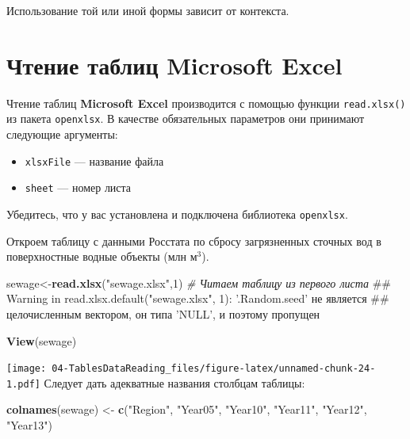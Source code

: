 \documentclass[]{book}
\newenvironment{Shaded}{\begin{snugshade}}{\end{snugshade}}
\newcommand{\KeywordTok}[1]{\textcolor[rgb]{0.13,0.29,0.53}{\textbf{#1}}}
\newcommand{\DecValTok}[1]{\textcolor[rgb]{0.00,0.00,0.81}{#1}}
\newcommand{\StringTok}[1]{\textcolor[rgb]{0.31,0.60,0.02}{#1}}
\newcommand{\CommentTok}[1]{\textcolor[rgb]{0.56,0.35,0.01}{\textit{#1}}}
\newcommand{\NormalTok}[1]{#1}
\providecommand{\tightlist}{%
  \setlength{\itemsep}{0pt}\setlength{\parskip}{0pt}}
\begin{document}
Использование той или иной формы зависит от контекста.

\section{Чтение таблиц Microsoft Excel}\label{excel_reading}

Чтение таблиц \textbf{Microsoft Excel} производится с помощью функции
\texttt{read.xlsx()} из пакета \texttt{openxlsx}. В качестве
обязательных параметров они принимают следующие аргументы:

\begin{itemize}
\tightlist
\item
  \texttt{xlsxFile} --- название файла
\item
  \texttt{sheet} --- номер листа
\end{itemize}

Убедитесь, что у вас установлена и подключена библиотека
\texttt{openxlsx}.

Откроем таблицу с данными Росстата по сбросу загрязненных сточных вод в
поверхностные водные объекты (млн м\(^3\)).

\begin{Shaded}
\begin{Highlighting}[]
\NormalTok{sewage<-}\KeywordTok{read.xlsx}\NormalTok{(}\StringTok{"sewage.xlsx"}\NormalTok{,}\DecValTok{1}\NormalTok{) }\CommentTok{# Читаем таблицу из первого листа}
\NormalTok{## Warning in read.xlsx.default("sewage.xlsx", 1): '.Random.seed' не является}
\NormalTok{## целочисленным вектором, он типа 'NULL', и поэтому пропущен}
\end{Highlighting}
\end{Shaded}

\begin{Shaded}
\begin{Highlighting}[]
\KeywordTok{View}\NormalTok{(sewage)}
\end{Highlighting}
\end{Shaded}

\texttt{[image: 04-TablesDataReading\_files/figure-latex/unnamed-chunk-24-1.pdf]}
Следует дать адекватные названия столбцам таблицы:

\begin{Shaded}
\begin{Highlighting}[]
\KeywordTok{colnames}\NormalTok{(sewage) <-}\StringTok{ }\KeywordTok{c}\NormalTok{(}\StringTok{"Region"}\NormalTok{, }\StringTok{"Year05"}\NormalTok{, }\StringTok{"Year10"}\NormalTok{, }\StringTok{"Year11"}\NormalTok{, }\StringTok{"Year12"}\NormalTok{, }\StringTok{"Year13"}\NormalTok{)}
\end{Highlighting}
\end{Shaded}
\end{document}
